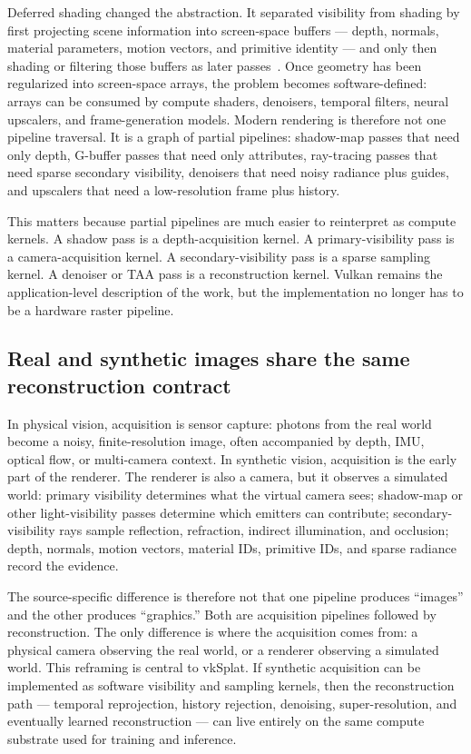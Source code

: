 \documentclass[10pt,journal]{IEEEtran}
\begin{document}
Deferred shading changed the abstraction. It separated visibility from
shading by first projecting scene information into screen-space buffers
--- depth, normals, material parameters, motion vectors, and primitive
identity --- and only then shading or filtering those buffers as later
passes~\cite{akenine2018}. Once geometry has been regularized into
screen-space arrays, the problem becomes software-defined: arrays can
be consumed by compute shaders, denoisers, temporal filters, neural
upscalers, and frame-generation models. Modern rendering is therefore
not one pipeline traversal. It is a graph of partial pipelines:
shadow-map passes that need only depth, G-buffer passes that need only
attributes, ray-tracing passes that need sparse secondary visibility,
denoisers that need noisy radiance plus guides, and upscalers that need
a low-resolution frame plus history.

This matters because partial pipelines are much easier to reinterpret
as compute kernels. A shadow pass is a depth-acquisition kernel. A
primary-visibility pass is a camera-acquisition kernel. A
secondary-visibility pass is a sparse sampling kernel. A denoiser or TAA
pass is a reconstruction kernel. Vulkan remains the application-level
description of the work, but the implementation no longer has to be a
hardware raster pipeline.

\subsection{Real and synthetic images share the same reconstruction
contract}

In physical vision, acquisition is sensor capture: photons from the
real world become a noisy, finite-resolution image, often accompanied
by depth, IMU, optical flow, or multi-camera context. In synthetic
vision, acquisition is the early part of the renderer. The renderer is
also a camera, but it observes a simulated world: primary visibility
determines what the virtual camera sees; shadow-map or other
light-visibility passes determine which emitters can contribute;
secondary-visibility rays sample reflection, refraction, indirect
illumination, and occlusion; depth, normals, motion vectors, material
IDs, primitive IDs, and sparse radiance record the evidence.

The source-specific difference is therefore not that one pipeline
produces ``images'' and the other produces ``graphics.'' Both are
acquisition pipelines followed by reconstruction. The only difference is
where the acquisition comes from: a physical camera observing the real
world, or a renderer observing a simulated world. This reframing is
central to vkSplat. If synthetic acquisition can be implemented as
software visibility and sampling kernels, then the reconstruction path
--- temporal reprojection, history rejection, denoising, super-resolution,
and eventually learned reconstruction --- can live entirely on the same
compute substrate used for training and inference.
\end{document}
